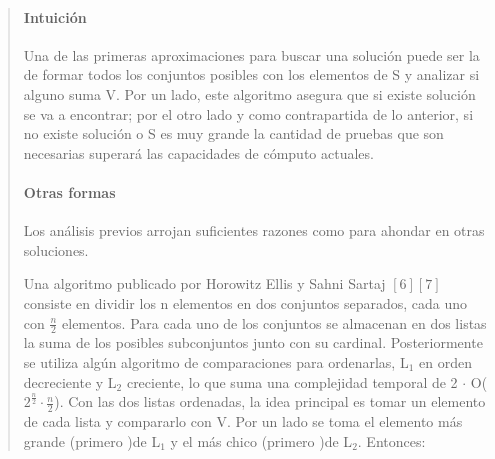 \documentclass[7pt,a4paper]{article}
\begin{document}
\begin{verse}
	\paragraph{Intuición} 	Una de las primeras aproximaciones para buscar una solución puede ser la de formar todos los conjuntos posibles con los elementos de S y analizar si alguno suma V. Por un lado, este algoritmo asegura que si existe solución se va a encontrar; por el otro lado y como contrapartida de lo anterior, si no existe solución o S es muy grande la cantidad de pruebas que son necesarias superará las capacidades de cómputo actuales. %
	
	\paragraph{Otras formas} Los análisis previos arrojan suficientes razones como para ahondar en otras soluciones.
	\bigskip
	
		Una algoritmo publicado por Horowitz Ellis y Sahni Sartaj $[6][7]$ consiste en dividir los n elementos en dos conjuntos separados, cada uno con $\frac{n}{2}$ elementos. Para cada uno de los conjuntos se almacenan en dos listas la suma de los posibles subconjuntos junto con su cardinal. Posteriormente se utiliza algún algoritmo de comparaciones para ordenarlas, L$_{1}$ en orden decreciente y L$_{2}$ creciente, lo que suma una complejidad temporal de 2 $\cdot$ O($2^{\frac{n}{2}} \cdot \frac{n}{2}$). Con las dos listas ordenadas, la idea principal es tomar un elemento de cada lista y compararlo con V. Por un lado se toma el elemento más grande (primero )de L$_{1}$ y el más chico (primero )de L$_{2}$. Entonces: 


\end{verse}
\end{document}
